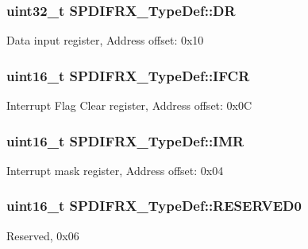 \subsubsection[{\texorpdfstring{DR}{DR}}]{ uint32\+\_\+t S\+P\+D\+I\+F\+R\+X\+\_\+\+Type\+Def\+::\+DR}\hypertarget{struct_s_p_d_i_f_r_x___type_def_aaffe413c3f6f3153b8b0b953df96e924}{}\label{struct_s_p_d_i_f_r_x___type_def_aaffe413c3f6f3153b8b0b953df96e924}
Data input register, Address offset\+: 0x10 
\subsubsection[{\texorpdfstring{I\+F\+CR}{IFCR}}]{ uint16\+\_\+t S\+P\+D\+I\+F\+R\+X\+\_\+\+Type\+Def\+::\+I\+F\+CR}\hypertarget{struct_s_p_d_i_f_r_x___type_def_a78e346c357c77b7fdece7c2c53471d3a}{}\label{struct_s_p_d_i_f_r_x___type_def_a78e346c357c77b7fdece7c2c53471d3a}
Interrupt Flag Clear register, Address offset\+: 0x0C 
\subsubsection[{\texorpdfstring{I\+MR}{IMR}}]{ uint16\+\_\+t S\+P\+D\+I\+F\+R\+X\+\_\+\+Type\+Def\+::\+I\+MR}\hypertarget{struct_s_p_d_i_f_r_x___type_def_a3687732427f15d9d1aaf7b7081ec75b1}{}\label{struct_s_p_d_i_f_r_x___type_def_a3687732427f15d9d1aaf7b7081ec75b1}
Interrupt mask register, Address offset\+: 0x04 
\subsubsection[{\texorpdfstring{R\+E\+S\+E\+R\+V\+E\+D0}{RESERVED0}}]{\setlength{\rightskip}{0pt plus 5cm}uint16\+\_\+t S\+P\+D\+I\+F\+R\+X\+\_\+\+Type\+Def\+::\+R\+E\+S\+E\+R\+V\+E\+D0}\hypertarget{struct_s_p_d_i_f_r_x___type_def_a8f6ab140199069c165eb87dc7a594576}{}\label{struct_s_p_d_i_f_r_x___type_def_a8f6ab140199069c165eb87dc7a594576}
Reserved, 0x06 
